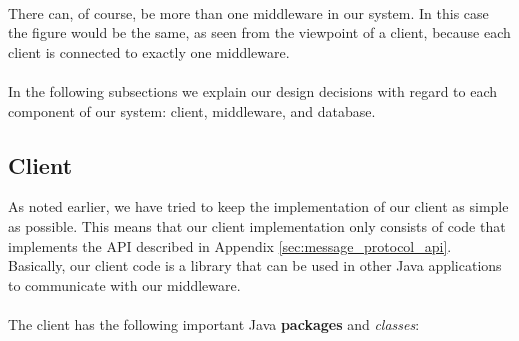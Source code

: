 \documentclass{article}
\begin{document}
         ~\\
         There can, of course, be more than one middleware in our system. In this case the figure would be the same, as seen from the viewpoint of a client, because each client is connected to exactly one middleware.\\
         \\
        In the following subsections we explain our design decisions with regard to each component of our system: client, middleware, and database.

        \subsection{Client}
            As noted earlier, we have tried to keep the implementation of our client as simple as possible. This means that our client implementation only consists of code that implements the API described in Appendix \ref{sec:message_protocol_api}. Basically, our client code is a library that can be used in other Java applications to communicate with our middleware.\\
            \\
            The client has the following important Java \textbf{packages} and \textit{classes}:
\end{document}
